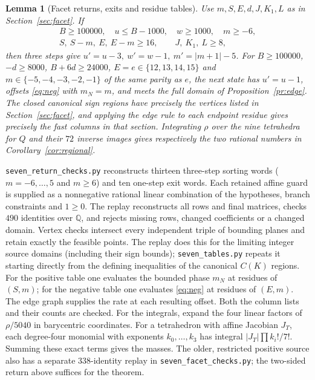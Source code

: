 \documentclass[11pt,reqno]{amsart}
\newtheorem{lemma}{Lemma}[section]
\begin{document}
\begin{lemma}[Facet returns, exits and residue tables]\label{l:facet}
Use $m,S,E,d,J,K_1,L$ as in Section~\ref{sec:facet}. If
\[
 \begin{gathered}
 B\ge100000,\quad u\le B-1000,\quad w\ge1000,\quad m\ge-6,\\
 S,\ S-m,\ E,\ E-m\ge16,\qquad J,\ K_1,\ L\ge8 ,
 \end{gathered}
\]
then three steps give $u'=u-3,\ w'=w-1,\ m'=|m+1|-5$.
For $B\ge100000$, $-d\ge8000$, $B+6d\ge24000$, $E=e\in\{12,13,14,15\}$
and $m\in\{-5,-4,-3,-2,-1\}$ of the same parity as $e$, the next state
has $u'=u-1$, offsets \eqref{eq:neg} with $m_N=m$, and meets the full
domain of Proposition~\ref{pr:edge}.
The closed canonical sign regions have precisely the vertices listed
in Section~\ref{sec:facet}, and applying the edge rule to each endpoint residue gives
precisely the fast columns in that section. Integrating $\rho$ over the
nine tetrahedra for $Q$ and their $72$ inverse images gives respectively
the two rational numbers in Corollary~\ref{cor:regional}.
\end{lemma}
\noindent
\texttt{seven\_return\_checks.py} reconstructs thirteen three-step
sorting words ($m=-6,\ldots,5$ and $m\ge6$) and ten one-step exit words.
Each retained affine guard is supplied as a nonnegative rational linear
combination of the hypotheses, branch constraints and $1\ge0$. The
replay reconstructs all rows and final matrices, checks $490$ identities
over $\mathbb Q$, and rejects missing rows, changed coefficients or a
changed domain. Vertex checks intersect every independent triple of
bounding planes and retain exactly the feasible points. The replay does
this for the limiting integer source domains (including their sign
bounds); \texttt{seven\_tables.py} repeats it starting directly from the
defining inequalities of the canonical $C(K)$ regions. For the positive
table one evaluates the bounded phase $m_N$ at residues of $(S,m)$; for
the negative table one evaluates \eqref{eq:neg} at residues of $(E,m)$.
The edge graph supplies the rate at each resulting offset. Both the column
lists and their counts are checked. For the integrals, expand the four
linear factors of $\rho/5040$ in barycentric coordinates. For a tetrahedron
with affine Jacobian $J_T$, each degree-four monomial with exponents
$k_0,\ldots,k_3$ has integral $|J_T|\prod k_i!/7!$. Summing these exact
terms gives the masses. The older, restricted positive source
also has a separate $338$-identity replay in \texttt{seven\_facet\_checks.py};
the two-sided return above suffices for the theorem.
\end{document}
